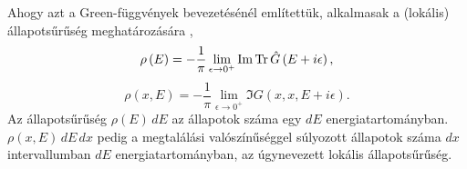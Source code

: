 Ahogy azt a Green-függvények bevezetésénél említettük, alkalmasak a (lokális) állapotsűrűség meghatározására \cite[7. o.]{economou2006green},
\begin{equation}
	\rho\left(E\right) = -\frac{1}{\pi}\lim_{\epsilon \to 0^+} \operatorname{Im}\operatorname{Tr}\hat{G}\left(E + i\epsilon\right),
	\label{green:densityeq}
\end{equation}
\begin{equation}
	\rho(x,E)=-\frac{1}{\pi}\lim_{\epsilon\to 0^+}\Im G(x,x,E+i\epsilon).
	\label{green:localdensityeq}
\end{equation}
Az állapotsűrűség $\rho(E)\,dE$ az állapotok száma egy $dE$ energiatartományban. $\rho(x,E)\,dE\,dx$ pedig a megtalálási valószínűséggel súlyozott állapotok száma $dx$ intervallumban $dE$ energiatartományban, az úgynevezett lokális állapotsűrűség.


